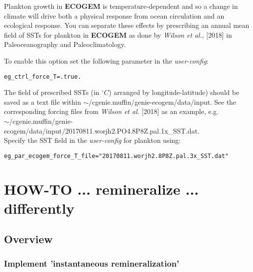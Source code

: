 \documentclass[11pt,fleqn]{book} %
\begin{document}
Plankton growth in \textbf{ECOGEM} is temperature-dependent and so a change in climate will drive both a physical response from ocean circulation and an ecological response. You can separate these effects by prescribing an annual mean field of SSTs for plankton in \textbf{ECOGEM} as done by \textit{Wilson et al.,} [2018] in Paleoceanography and Paleoclimatology. 

To enable this option set the following parameter in the \textit{user-config}:
\vspace{-1mm}\begin{verbatim}
eg_ctrl_force_T=.true.
\end{verbatim}\vspace{-1mm}
The field of prescribed SSTs (in \(^{\circ} C\)) arranged by longitude-latitude) should be saved as a text file within \textsf{\footnotesize \(\sim\)/cgenie.muffin/genie-ecogem/data/input}. See the corresponding forcing files from \textit{Wilson et al.} [2018] as an example, e.g.
\vspace{1mm}
\\\textsf{\footnotesize \(\sim\)/cgenie.muffin/genie-ecogem/data/input/20170811.worjh2.PO4.8P8Z.pal.1x\_SST.dat}.
\vspace{1mm}
\\Specify the SST field in the \textit{user-config} for plankton using:
\vspace{-2mm}\begin{verbatim}
eg_par_ecogem_force_T_file="20170811.worjh2.8P8Z.pal.3x_SST.dat"
\end{verbatim}\vspace{-1mm}


\newpage


\section{HOW-TO ... remineralize ... differently}

%
\subsection*{Overview}
\vspace{1mm}

\hfill \break

\subsubsection{Implement 'instantaneous remineralization'}
\vspace{1mm}
\end{document}

